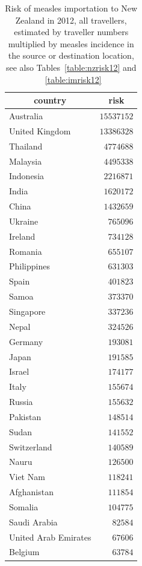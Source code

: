 \documentclass{article}
\begin{document}
\begin{table}
\caption{Risk of measles importation to New Zealand in 2012, all travellers, estimated by traveller numbers multiplied by measles incidence in the source or destination location, see also Tables~\autoref{table:nzrisk12} and ~\autoref{table:imrisk12}}
\begin{center}
\begin{tabular}{lr}
\hline\hline
\multicolumn{1}{c}{country}&\multicolumn{1}{c}{risk}\tabularnewline
\hline
Australia&$15537152$\tabularnewline
United Kingdom&$13386328$\tabularnewline
Thailand&$ 4774688$\tabularnewline
Malaysia&$ 4495338$\tabularnewline
Indonesia&$ 2216871$\tabularnewline
India&$ 1620172$\tabularnewline
China&$ 1432659$\tabularnewline
Ukraine&$  765096$\tabularnewline
Ireland&$  734128$\tabularnewline
Romania&$  655107$\tabularnewline
Philippines&$  631303$\tabularnewline
Spain&$  401823$\tabularnewline
Samoa&$  373370$\tabularnewline
Singapore&$  337236$\tabularnewline
Nepal&$  324526$\tabularnewline
Germany&$  193081$\tabularnewline
Japan&$  191585$\tabularnewline
Israel&$  174177$\tabularnewline
Italy&$  155674$\tabularnewline
Russia&$  155632$\tabularnewline
Pakistan&$  148514$\tabularnewline
Sudan&$  141552$\tabularnewline
Switzerland&$  140589$\tabularnewline
Nauru&$  126500$\tabularnewline
Viet Nam&$  118241$\tabularnewline
Afghanistan&$  111854$\tabularnewline
Somalia&$  104775$\tabularnewline
Saudi Arabia&$   82584$\tabularnewline
United Arab Emirates&$   67606$\tabularnewline
Belgium&$   63784$\tabularnewline
\hline
\end{tabular}\end{center}\label{table:risk12}
\end{table}
\end{document}
